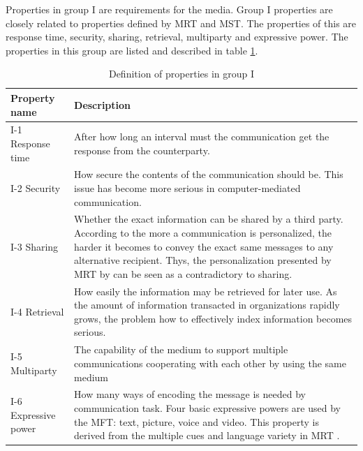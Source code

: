 \documentclass[english,12pt,a4paper,pdftex]{article}
\begin{document}
Properties in group I are requirements for the media. Group I properties are closely related to properties defined by \ac{MRT} and \ac{MST}. The properties of this are response time, security, sharing, retrieval, multiparty and expressive power. The properties in this group are listed and described in table \ref{table:mft_group1}.

\begin{table}[!h]
\renewcommand{\arraystretch}{1.3}
\caption{Definition of properties in group I}
\label{table:mft_group1}
\centering
\begin{tabular}{|p{4cm}|p{10cm}|}
\hline
\textbf{Property name} & \textbf{Description}\\
\hline
I-1 Response time & After how long an interval must the communication get the response from the counterparty. \\
\hline
I-2 Security & How secure the contents of the communication should be. This issue has become more serious in computer-mediated communication. \\
\hline
I-3 Sharing & Whether the exact information can be shared by a third party. According to \citet{higa2007} the more a communication is personalized, the harder it becomes to convey the exact same messages to any alternative recipient. Thys, the personalization presented by \ac{MRT} by \citet{daft1986} can be seen as a contradictory to sharing. \\
\hline
I-4 Retrieval & How easily the information may be retrieved for later use. As the amount of information transacted in organizations rapidly grows, the problem how to effectively index information becomes serious. \\
\hline
I-5 Multiparty & The capability of the medium to support multiple communications cooperating with each other by using the same medium \\
\hline
I-6 Expressive power & How many ways of encoding the message is needed by communication task. Four basic expressive powers are used by the \ac{MFT}: text, picture, voice and video. This property is derived from the multiple cues and language variety in MRT \citep{daft1986}. \\
\hline
\end{tabular}
\end{table}
\end{document}
